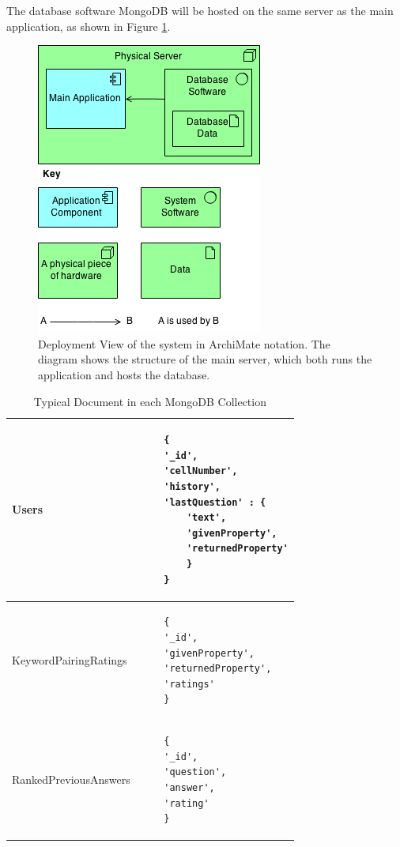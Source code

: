 \documentclass[authoryearcitations]{UoYCSproject}
\begin{document}
The database software MongoDB will be hosted on the same server as the main application, as shown in Figure \ref{fig:physicalServerDb}.

\begin{figure}[htb] 
\centerline{\includegraphics[width=0.6\linewidth]{physicalServerDb}}
\caption{Deployment View of the system in ArchiMate notation. The diagram shows the structure of the main server, which both runs the application and hosts the database.}
\label{fig:physicalServerDb}
\end{figure}


\begin{table}
\begin{center}
    \begin{tabular}{| l | l |}
    \hline
    
    Users &
    \begin{lstlisting}
    {
    '_id',
    'cellNumber',
    'history',
    'lastQuestion' : {
        'text',
        'givenProperty',
        'returnedProperty'
        }
    }
    \end{lstlisting}
    \\ \hline
    
    KeywordPairingRatings &
    \begin{lstlisting}
    {
    '_id',
    'givenProperty',
    'returnedProperty',
    'ratings'
    }
    \end{lstlisting}
    \\ \hline
    
    RankedPreviousAnswers &
    \begin{lstlisting}
    {
    '_id',
    'question',
    'answer',
    'rating'
    }
    \end{lstlisting}
    \\ \hline
    
    \end{tabular}
    \caption{Typical Document in each MongoDB Collection}
    \label{table:collectionStructure}
\end{center}
\end{table}
\end{document}
